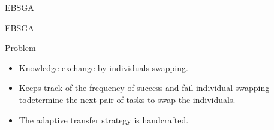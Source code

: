 \begin{frame}{EBSGA}
    \begin{block}{EBSGA}
    \end{block}
    \begin{block}{Problem}
        \begin{itemize}
            \item Knowledge exchange by individuals swapping.
            \item Keeps track of the frequency of success and fail individual swapping  todetermine the next pair of tasks to swap the individuals.
            \item The adaptive transfer strategy is handcrafted.
        \end{itemize}
    \end{block}
\end{frame}
